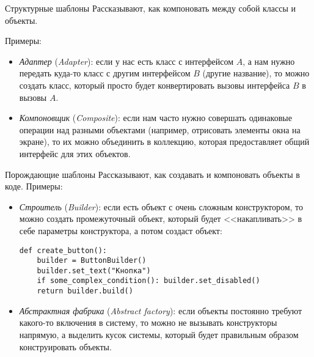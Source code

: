 \begin{frame}{Структурные шаблоны}
	Рассказывают, как компоновать между собой классы и объекты.

	Примеры:
	\begin{itemize}
		\item
			\textit{Адаптер} (\textit{Adapter}): если у нас есть класс с интерфейсом $A$, а нам нужно передать куда-то класс с другим интерфейсом $B$
			(другие название), то можно создать класс, который просто будет конвертировать вызовы интерфейса $B$ в вызовы $A$.
		\item
			\textit{Компоновщик} (\textit{Composite}): если нам часто нужно совершать одинаковые операции над разными объектами (например, отрисовать элементы
			окна на экране), то их можно объединить в коллекцию, которая предоставляет общий интерфейс для этих объектов.
	\end{itemize}
\end{frame}

\begin{frame}[fragile]{Порождающие шаблоны}
	Рассказывают, как создавать и компоновать объекты в коде.
	Примеры:
	\begin{itemize}
		\item
			\textit{Строитель} (\textit{Builder}): если есть объект с очень сложным конструктором, то можно создать
			промежуточный объект, который будет <<накапливать>> в себе параметры конструктора, а потом создаст объект:
\begin{verbatim}
def create_button():
    builder = ButtonBuilder()
    builder.set_text("Кнопка")
    if some_complex_condition(): builder.set_disabled()
    return builder.build()
\end{verbatim}
		\item
			\textit{Абстрактная фабрика}  (\textit{Abstract factory}): если объекты постоянно требуют какого-то включения в систему, то можно
			не вызывать конструкторы напрямую, а выделить кусок системы, который будет
			правильным образом конструировать объекты.
	\end{itemize}
\end{frame}
